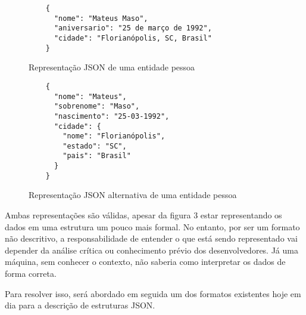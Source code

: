 \begin{figure}[H]
  \centering
  \begin{verbatim}
    {
      "nome": "Mateus Maso",
      "aniversario": "25 de março de 1992",
      "cidade": "Florianópolis, SC, Brasil"
    }
  \end{verbatim}
  \caption{Representação JSON de uma entidade pessoa}
\end{figure}

\begin{figure}[H]
  \centering
  \begin{verbatim}
    {
      "nome": "Mateus",
      "sobrenome": "Maso",
      "nascimento": "25-03-1992",
      "cidade": {
        "nome": "Florianópolis",
        "estado": "SC",
        "pais": "Brasil"
      }
    }
  \end{verbatim}
  \caption{Representação JSON alternativa de uma entidade pessoa}
\end{figure}

Ambas representações são válidas, apesar da figura 3 estar representando os dados em uma estrutura um pouco mais formal. No entanto, por ser um formato não descritivo, a responsabilidade de entender o que está sendo representado vai depender da análise crítica ou conhecimento prévio dos desenvolvedores. Já uma máquina, sem conhecer o contexto, não saberia como interpretar os dados de forma correta. \cite{Droettboom2015}

Para resolver isso, será abordado em seguida um dos formatos existentes hoje em dia para a descrição de estruturas JSON.
